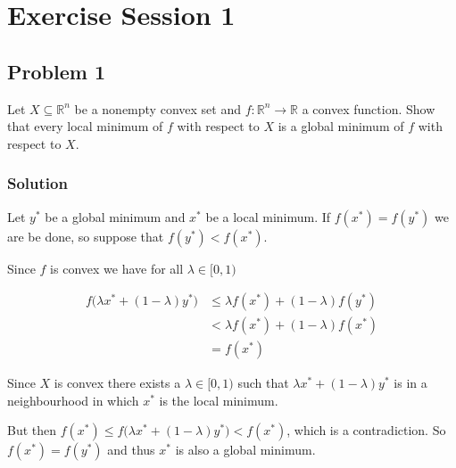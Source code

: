 \documentclass[11pt, a4paper]{article}
\begin{document}
\section*{Exercise Session 1}

\subsection*{Problem 1}

Let $X \subseteq \mathbb{R}^n$ be a nonempty convex set and $f : \mathbb{R}^n \to \mathbb{R}$ a convex function. Show that every local minimum of $f$ with respect to $X$ is a global minimum of $f$ with respect to $X$.

\subsubsection*{Solution}

Let $y^*$ be a global minimum and $x^*$ be a local minimum. If $f(x^*) = f(y^*)$ we are be done, so suppose that $f(y^*) < f(x^*)$.

Since $f$ is convex we have for all $\lambda \in [0, 1)$

\begin{align*}
f \big( \lambda x^* + (1-\lambda) y^* \big) &\le \lambda f(x^*) + (1-\lambda) f(y^*) \\
&< \lambda f(x^*) + (1-\lambda) f(x^*) \\
&= f(x^*)
\end{align*}

Since $X$ is convex there exists a $\lambda \in [0,1)$ such that $\lambda x^* + (1-\lambda) y^*$ is in a neighbourhood in which $x^*$ is the local minimum.

But then $f(x^*) \le f \big( \lambda x^* + (1-\lambda) y^* \big) < f(x^*)$, which is a contradiction. So $f(x^*) = f(y^*)$ and thus $x^*$ is also a global minimum.
\end{document}
